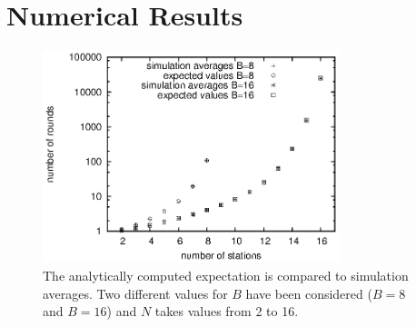 \documentclass[journal]{IEEEtran}
\begin{document}
% 
% 
% 
% 
% 
% 
% 

\section{Numerical Results}
\label{sec:numerical_results}

\begin{figure}
\centering
\includegraphics[height=6.2cm]{figures/convergence_avg}
\caption{The analytically computed expectation is compared to simulation averages. Two different values for $B$ have been considered ($B=8$ and $B=16$) and $N$ takes values from 2 to 16.}
\label{fig:convergence_avg}
\end{figure}
\end{document}
